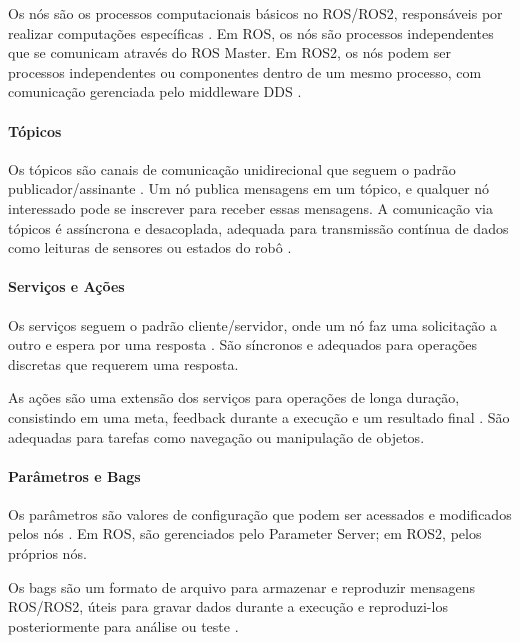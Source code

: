 Os nós são os processos computacionais básicos no ROS/ROS2, responsáveis por realizar computações específicas \cite{Quigley2009, Joseph2018}. Em ROS, os nós são processos independentes que se comunicam através do ROS Master. Em ROS2, os nós podem ser processos independentes ou componentes dentro de um mesmo processo, com comunicação gerenciada pelo middleware DDS \cite{Macenski2022}.

\paragraph{Tópicos}

Os tópicos são canais de comunicação unidirecional que seguem o padrão publicador\slash\allowbreak assinante \cite{Quigley2009, Joseph2018}. Um nó publica mensagens em um tópico, e qualquer nó interessado pode se inscrever para receber essas mensagens. A comunicação via tópicos é assíncrona e desacoplada, adequada para transmissão contínua de dados como leituras de sensores ou estados do robô \cite{Macenski2022}.

\paragraph{Serviços e Ações}

Os serviços seguem o padrão cliente/servidor, onde um nó faz uma solicitação a outro e espera por uma resposta \cite{Quigley2009, Joseph2018}. São síncronos e adequados para operações discretas que requerem uma resposta.

As ações são uma extensão dos serviços para operações de longa duração, consistindo em uma meta, feedback durante a execução e um resultado final \cite{Joseph2018, Macenski2022}. São adequadas para tarefas como navegação ou manipulação de objetos.

\paragraph{Parâmetros e Bags}

Os parâmetros são valores de configuração que podem ser acessados e modificados pelos nós \cite{Quigley2009, Joseph2018}. Em ROS, são gerenciados pelo Parameter Server; em ROS2, pelos próprios nós.

Os bags são um formato de arquivo para armazenar e reproduzir mensagens ROS/ROS2, úteis para gravar dados durante a execução e reproduzi-los posteriormente para análise ou teste \cite{Quigley2009, Joseph2018}.


